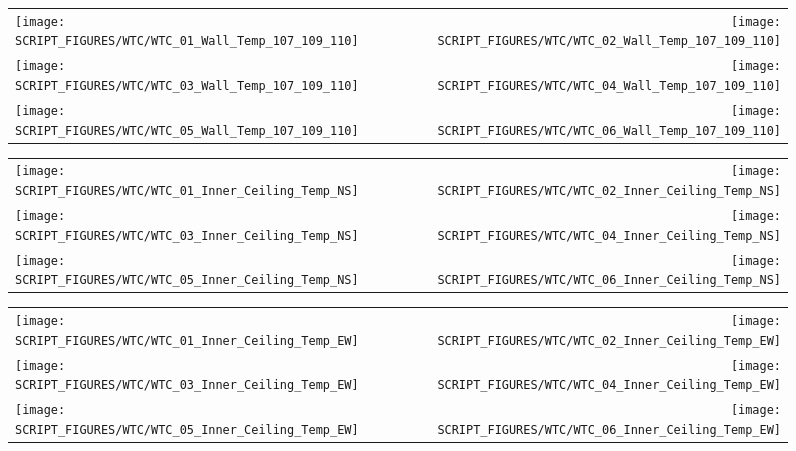 \begin{figure}[p]
\begin{tabular*}{\textwidth}{l@{\extracolsep{\fill}}r}
\texttt{[image: SCRIPT\_FIGURES/WTC/WTC\_01\_Wall\_Temp\_107\_109\_110]} &
\texttt{[image: SCRIPT\_FIGURES/WTC/WTC\_02\_Wall\_Temp\_107\_109\_110]} \\
\texttt{[image: SCRIPT\_FIGURES/WTC/WTC\_03\_Wall\_Temp\_107\_109\_110]} &
\texttt{[image: SCRIPT\_FIGURES/WTC/WTC\_04\_Wall\_Temp\_107\_109\_110]} \\
\texttt{[image: SCRIPT\_FIGURES/WTC/WTC\_05\_Wall\_Temp\_107\_109\_110]} &
\texttt{[image: SCRIPT\_FIGURES/WTC/WTC\_06\_Wall\_Temp\_107\_109\_110]}
\end{tabular*}
\label{NIST_WTC_Wall_107_109_110}
\end{figure}

\begin{figure}[p]
\begin{tabular*}{\textwidth}{l@{\extracolsep{\fill}}r}
\texttt{[image: SCRIPT\_FIGURES/WTC/WTC\_01\_Inner\_Ceiling\_Temp\_NS]} &
\texttt{[image: SCRIPT\_FIGURES/WTC/WTC\_02\_Inner\_Ceiling\_Temp\_NS]} \\
\texttt{[image: SCRIPT\_FIGURES/WTC/WTC\_03\_Inner\_Ceiling\_Temp\_NS]} &
\texttt{[image: SCRIPT\_FIGURES/WTC/WTC\_04\_Inner\_Ceiling\_Temp\_NS]} \\
\texttt{[image: SCRIPT\_FIGURES/WTC/WTC\_05\_Inner\_Ceiling\_Temp\_NS]} &
\texttt{[image: SCRIPT\_FIGURES/WTC/WTC\_06\_Inner\_Ceiling\_Temp\_NS]}
\end{tabular*}
\label{NIST_WTC_Inner_Ceiling_NS}
\end{figure}

\begin{figure}[p]
\begin{tabular*}{\textwidth}{l@{\extracolsep{\fill}}r}
\texttt{[image: SCRIPT\_FIGURES/WTC/WTC\_01\_Inner\_Ceiling\_Temp\_EW]} &
\texttt{[image: SCRIPT\_FIGURES/WTC/WTC\_02\_Inner\_Ceiling\_Temp\_EW]} \\
\texttt{[image: SCRIPT\_FIGURES/WTC/WTC\_03\_Inner\_Ceiling\_Temp\_EW]} &
\texttt{[image: SCRIPT\_FIGURES/WTC/WTC\_04\_Inner\_Ceiling\_Temp\_EW]} \\
\texttt{[image: SCRIPT\_FIGURES/WTC/WTC\_05\_Inner\_Ceiling\_Temp\_EW]} &
\texttt{[image: SCRIPT\_FIGURES/WTC/WTC\_06\_Inner\_Ceiling\_Temp\_EW]}
\end{tabular*}
\label{NIST_WTC_Inner_Ceiling_EW}
\end{figure}


